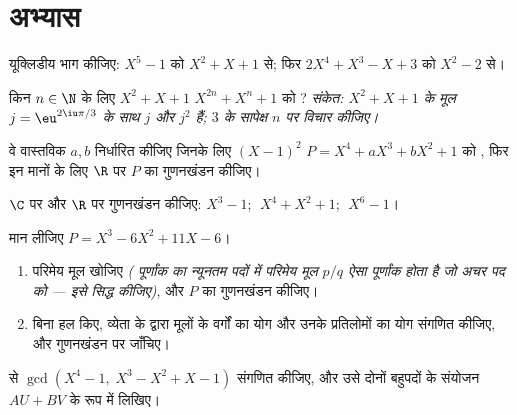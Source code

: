 \section{अभ्यास}

\begin{exercise}[$\star$]\label{exo:b1:poly:1}
यूक्लिडीय भाग कीजिए: $X^5 - 1$ को $X^2 + X + 1$ से; फिर $2X^4 + X^3 - X + 3$
को $X^2 - 2$ से।
\end{exercise}

\begin{exercise}[$\star$]\label{exo:b1:poly:2}
किन $n \in \N$ के लिए $X^2 + X + 1$ $X^{2n} + X^n + 1$ को ?
\emph{संकेत: $X^2 + X + 1$ के मूल $j = \eu^{2\iu\pi/3}$ के साथ $j$ और $j^2$
हैं; $3$ के सापेक्ष $n$ पर विचार कीजिए।}
\end{exercise}

\begin{exercise}[$\star$]\label{exo:b1:poly:3}
वे वास्तविक $a, b$ निर्धारित कीजिए जिनके लिए $(X-1)^2$ $P = X^4 + aX^3 +
bX^2 + 1$ को , फिर इन मानों के लिए $\R$ पर $P$ का गुणनखंडन
कीजिए।
\end{exercise}

\begin{exercise}[$\star$]\label{exo:b1:poly:4}
$\C$ पर और $\R$ पर गुणनखंडन कीजिए: $X^3 - 1$; $\;X^4 + X^2 + 1$; $\;X^6 -
1$।
\end{exercise}

\begin{exercise}[$\star\star$]\label{exo:b1:poly:5}
मान लीजिए $P = X^3 - 6X^2 + 11X - 6$।
\begin{enumerate}
  \item परिमेय मूल खोजिए \emph{( पूर्णांक  का न्यूनतम पदों में
  परिमेय मूल $p/q$ ऐसा पूर्णांक होता है जो अचर पद को  --- इसे
  सिद्ध कीजिए)}, और $P$ का गुणनखंडन कीजिए।
  \item बिना हल किए, व्येता के द्वारा मूलों के वर्गों का योग और उनके
  प्रतिलोमों का योग संगणित कीजिए, और गुणनखंडन पर जाँचिए।
\end{enumerate}
\end{exercise}

\begin{exercise}[$\star\star$]\label{exo:b1:poly:6}
 से $\gcd(X^4 - 1,\; X^3 - X^2 + X - 1)$ संगणित कीजिए, और
उसे दोनों बहुपदों के संयोजन $AU + BV$ के रूप में लिखिए।
\end{exercise}

